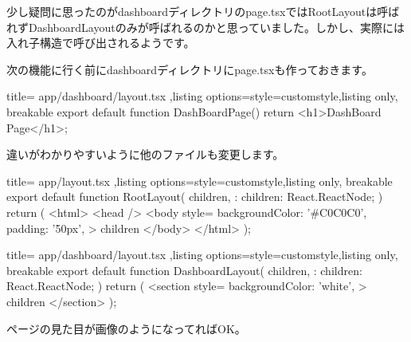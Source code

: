 少し疑問に思ったのがdashboardディレクトリのpage.tsxではRootLayoutは呼ばれずDashboardLayoutのみが呼ばれるのかと思っていました。しかし、実際には入れ子構造で呼び出されるようです。



次の機能に行く前にdashboardディレクトリにpage.tsxも作っておきます。
\begin{tcblisting}{title={
        app/dashboard/layout.tsx
      },listing options={style=customstyle},listing only, breakable}
  export default function DashBoardPage() {
      return <h1>DashBoard Page</h1>;
  }

\end{tcblisting}


違いがわかりやすいように他のファイルも変更します。
\begin{tcblisting}{title={
        app/layout.tsx
      },listing options={style=customstyle},listing only, breakable}
      export default function RootLayout({
        children,
      }: {
        children: React.ReactNode;
      }) {
        return (
          <html>
            <head />
            <body
              style={{
                backgroundColor: '#C0C0C0',
                padding: '50px',
              }}
            >
              {children}
            </body>
          </html>
        );
      }
      

\end{tcblisting}




\begin{tcblisting}{title={
        app/dashboard/layout.tsx
      },listing options={style=customstyle},listing only, breakable}
      export default function DashboardLayout({
        children,
      }: {
        children: React.ReactNode;
      }) {
        return (
          <section
            style={{
              backgroundColor: 'white',            
            }}
          >
            {children}
          </section>
        );
      }
\end{tcblisting}



ページの見た目が画像のようになってればOK。


